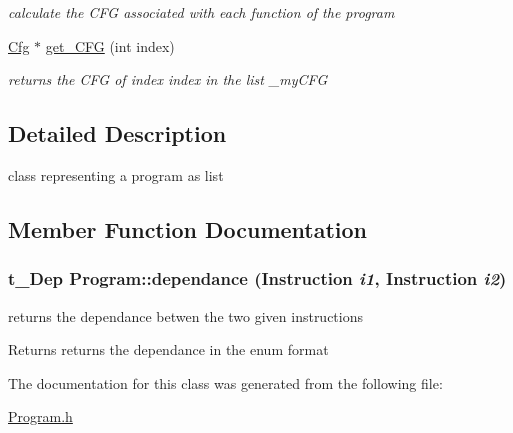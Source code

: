 \begin{DoxyCompactItemize}
\begin{DoxyCompactList}\small\item\em calculate the CFG associated with each function of the program \item\end{DoxyCompactList}\item 
\hypertarget{classProgram_a69ddee195c76bff05733d927e315f319}{
\hyperlink{classCfg}{Cfg} $\ast$ \hyperlink{classProgram_a69ddee195c76bff05733d927e315f319}{get\_\-CFG} (int index)}
\label{classProgram_a69ddee195c76bff05733d927e315f319}

\begin{DoxyCompactList}\small\item\em returns the CFG of index index in the list \_\-myCFG \item\end{DoxyCompactList}\end{DoxyCompactItemize}


\subsection{Detailed Description}
class representing a program as list 

\subsection{Member Function Documentation}
\hypertarget{classProgram_a9626cf3dd2cd7851fb28d84fd6632f52}{
\subsubsection[{dependance}]{\setlength{\rightskip}{0pt plus 5cm}t\_\-Dep Program::dependance ({\bf Instruction} {\em i1}, \/  {\bf Instruction} {\em i2})}}
\label{classProgram_a9626cf3dd2cd7851fb28d84fd6632f52}


returns the dependance betwen the two given instructions \begin{DoxyReturn}{Returns}
returns the dependance in the enum format 
\end{DoxyReturn}


The documentation for this class was generated from the following file:\begin{DoxyCompactItemize}
\item 
\hyperlink{Program_8h}{Program.h}\end{DoxyCompactItemize}
